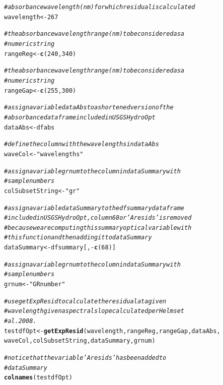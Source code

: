 \documentclass[a4paper,11pt]{article}\usepackage[]{graphicx}\usepackage[]{color}
\makeatletter
\newcommand{\hlnum}[1]{\textcolor[rgb]{0.686,0.059,0.569}{#1}}%
\newcommand{\hlstr}[1]{\textcolor[rgb]{0.192,0.494,0.8}{#1}}%
\newcommand{\hlcom}[1]{\textcolor[rgb]{0.678,0.584,0.686}{\textit{#1}}}%
\newcommand{\hlopt}[1]{\textcolor[rgb]{0,0,0}{#1}}%
\newcommand{\hlstd}[1]{\textcolor[rgb]{0.345,0.345,0.345}{#1}}%
\newcommand{\hlkwb}[1]{\textcolor[rgb]{0.69,0.353,0.396}{#1}}%
\newcommand{\hlkwd}[1]{\textcolor[rgb]{0.737,0.353,0.396}{\textbf{#1}}}%
\newenvironment{kframe}{%
 \def\at@end@of@kframe{}%
 \ifinner\ifhmode%
  \def\at@end@of@kframe{\end{minipage}}%
  \begin{minipage}{\columnwidth}%
 \fi\fi%
 \def\FrameCommand##1{\hskip\@totalleftmargin \hskip-\fboxsep
 \colorbox{shadecolor}{##1}\hskip-\fboxsep
     \hskip-\linewidth \hskip-\@totalleftmargin \hskip\columnwidth}%
 \MakeFramed {\advance\hsize-\width
   \@totalleftmargin\z@ \linewidth\hsize
   \@setminipage}}%
 {\par\unskip\endMakeFramed%
 \at@end@of@kframe}
\newenvironment{knitrout}{}{} %
\makeatother
\begin{document}
\begin{knitrout}
\color{fgcolor}\begin{kframe}
\begin{alltt}
\hlcom{# absorbance wavelength (nm) for which residual is calculated}
\hlstd{wavelength} \hlkwb{<-} \hlnum{267}

\hlcom{# the absorbance wavelength range (nm) to be considered as a}
\hlcom{# numeric string}
\hlstd{rangeReg} \hlkwb{<-} \hlkwd{c}\hlstd{(}\hlnum{240}\hlstd{,} \hlnum{340}\hlstd{)}

\hlcom{# the absorbance wavelength range (nm) to be considered as a}
\hlcom{# numeric string}
\hlstd{rangeGap} \hlkwb{<-} \hlkwd{c}\hlstd{(}\hlnum{255}\hlstd{,} \hlnum{300}\hlstd{)}

\hlcom{# assign a variable dataAbs to a shortened version of the}
\hlcom{# absorbance dataframe included in USGSHydroOpt}
\hlstd{dataAbs} \hlkwb{<-} \hlstd{dfabs}

\hlcom{# define the column with the wavelengths in dataAbs}
\hlstd{waveCol} \hlkwb{<-} \hlstr{"wavelengths"}

\hlcom{# assign a variable grnum to the column in dataSummary with}
\hlcom{# sample numbers}
\hlstd{colSubsetString} \hlkwb{<-} \hlstr{"gr"}

\hlcom{# assign a variable dataSummary to the dfsummary dataframe}
\hlcom{# included in USGSHydroOpt, column 68 or 'Aresids' is removed}
\hlcom{# because we are computing this summary optical variable with}
\hlcom{# this function and then adding it to dataSummary}
\hlstd{dataSummary} \hlkwb{<-} \hlstd{dfsummary[,} \hlopt{-}\hlkwd{c}\hlstd{(}\hlnum{68}\hlstd{)]}

\hlcom{# assign a variable grnum to the column in dataSummary with}
\hlcom{# sample numbers}
\hlstd{grnum} \hlkwb{<-} \hlstr{"GRnumber"}

\hlcom{# use getExpResid to calculate the residual at a given}
\hlcom{# wavelength given a spectral slope calculated per Helms et}
\hlcom{# al. 2008.}
\hlstd{testdfOpt} \hlkwb{<-} \hlkwd{getExpResid}\hlstd{(wavelength, rangeReg, rangeGap, dataAbs,}
    \hlstd{waveCol, colSubsetString, dataSummary, grnum)}

\hlcom{# notice that the variable 'Aresids' has been added to}
\hlcom{# dataSummary}
\hlkwd{colnames}\hlstd{(testdfOpt)}
\end{alltt}
\end{kframe}
\end{knitrout}
\end{document}
